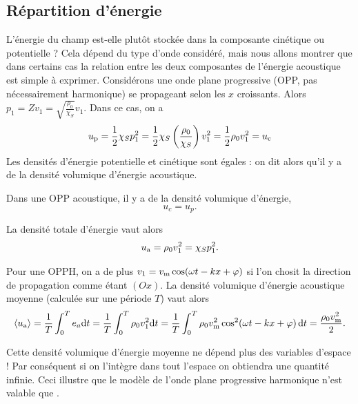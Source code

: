 \documentclass[12pt,fancy]{cours}
\begin{document}

\subsection{Répartition d'énergie}
L'énergie du champ est-elle plutôt stockée dans la composante cinétique ou potentielle ? Cela dépend du type d'onde considéré, mais nous allons montrer que dans certains cas la relation entre les deux composantes de l'énergie acoustique est simple à exprimer.
Considérons une onde plane progressive (OPP, pas nécessairement harmonique) se propageant selon les $x$ croissants. Alors $p_1=Zv_1=\sqrt{\frac{\rho_0}{\chi_S}}v_1$. Dans ce cas, on a
\begin{equation}
	u_{\rm p} = \frac{1}{2}\chi_S p_1^2 = \frac{1}{2}\chi_S\left(\frac{\rho_0}{\chi_S}\right)v_1^2 = \frac{1}{2}\rho_0v_1^2 = u_{\rm c}
\end{equation}
Les densités d'énergie potentielle et cinétique sont égales : on dit alors qu'il y a  de la densité volumique d'énergie acoustique.

\begin{prop}\label{prop:}
	Dans une OPP acoustique, il y a  de la densité volumique d'énergie,
	$$
u_c  = u_p.
	$$
\end{prop}
La densité totale d'énergie vaut alors
\begin{equation}
u_{\rm{a}}=\rho_0 v_1^2=\chi_S p_1^2.
\end{equation}

Pour une OPPH, on a de plus $v_1=v_{\rm{m}}\cos(\omega t-kx + \varphi)$ si l'on chosit la direction de propagation comme étant $(Ox)$. La densité volumique d'énergie acoustique moyenne (calculée sur une période $T$) vaut alors
\begin{equation}
\left\langle {u_{\rm{a}}} \right\rangle = \frac{1}{T}\int_{0}^{T} e_a \mathrm{d} t = \frac{1}{T}\int_{0}^{T}\rho_0 v_1^2 \mathrm{d} t = \frac{1}{T}\int_{0}^{T}\rho_0 v_{\rm{m}}^2\cos^{2}(\omega t-kx + \varphi)\,\mathrm{d} t=\frac{\rho_0 v_{\rm{m}}^2}{2}.
\end{equation}

\begin{remarque}
Cette densité volumique d'énergie moyenne ne dépend plus des variables d'espace ! Par conséquent si on l'intègre dans tout l'espace on obtiendra une quantité infinie. Ceci illustre que le modèle de l'onde plane progressive harmonique n'est valable que .
\end{remarque}
\end{document}

